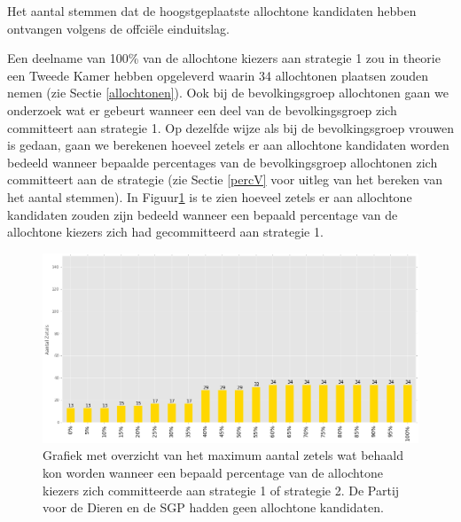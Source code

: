 \begin{table}[H]
\centering
	\begin{footnotesize}
		
	\end{footnotesize}
			\caption{Het aantal stemmen dat de hoogstgeplaatste allochtone kandidaten hebben ontvangen volgens de offci\"{e}le einduitslag.}
\label{table:HoogstA} 
\end{table}





\indent Een deelname van 100\% van de allochtone kiezers aan strategie 1 zou in theorie een Tweede Kamer hebben opgeleverd waarin 34 allochtonen plaatsen zouden nemen (zie Sectie \ref{allochtonen}). Ook bij de bevolkingsgroep allochtonen gaan we onderzoek wat er gebeurt wanneer een deel van de bevolkingsgroep zich committeert aan strategie 1. Op dezelfde wijze als bij de bevolkingsgroep vrouwen is gedaan, gaan we berekenen hoeveel zetels er aan allochtone kandidaten worden bedeeld wanneer bepaalde percentages van de bevolkingsgroep allochtonen zich committeert aan de strategie (zie Sectie \ref{percV} voor uitleg van het bereken van het aantal stemmen). In Figuur\ref{fig:PerA} is te zien hoeveel zetels er aan allochtone kandidaten zouden zijn bedeeld wanneer een bepaald percentage van de allochtone kiezers zich had gecommitteerd aan strategie 1.  

\begin{figure}[H]


	\includegraphics[width=\linewidth]{percentages_van_allochtonen.png}

			\caption{Grafiek met overzicht van het maximum aantal zetels wat behaald kon worden wanneer een bepaald percentage van de allochtone kiezers zich committeerde aan strategie 1 of strategie 2. De Partij voor de Dieren en de SGP hadden geen allochtone kandidaten.}

\label{fig:PerA}
\end{figure}

